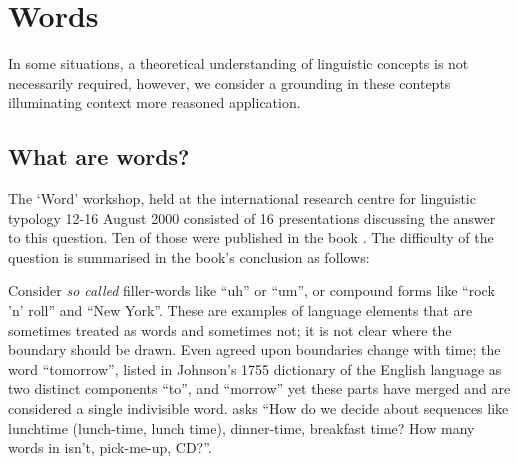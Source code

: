 \chapter{Words}\label{chap:words}
In some situations, a theoretical understanding of linguistic concepts is not necessarily required, however, we consider a grounding in these contepts illuminating context more reasoned application.

\section{What are words?}
\noindent
The `Word' workshop, held at the international research centre for linguistic typology 12-16 August 2000 consisted of 16 presentations discussing the answer to this question. Ten of those were published in the book \smartcite{dixon02-word}. The difficulty of the question is summarised in the book's conclusion as follows:


Consider \emph{so called} filler-words like ``uh'' or ``um'', or compound forms like ``rock 'n' roll'' and ``New York''. These are examples of language elements that are sometimes treated as words and sometimes not; it is not clear where the boundary should be drawn. Even agreed upon boundaries change with time; the word ``tomorrow'', listed in Johnson's 1755 dictionary of the English language as two distinct components ``to'', and ``morrow'' yet these parts have merged and are considered a single indivisible word. \textcite{halliday-2004-lexicology} asks ``How do we decide about sequences like lunchtime (lunch-time, lunch time), dinner-time, breakfast time? How many words in isn't, pick-me-up, CD?''.

